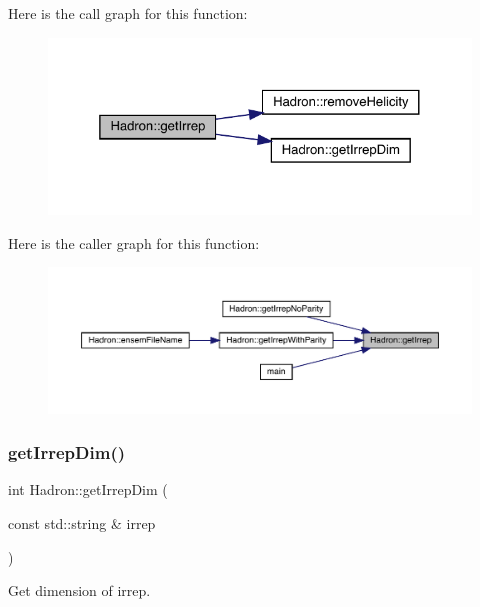 Here is the call graph for this function\+:\nopagebreak
\begin{figure}[H]
\begin{center}
\leavevmode
\includegraphics[width=325pt]{d1/daf/namespaceHadron_a33d1d1e15a13f881d974049a8ae1c3dc_cgraph}
\end{center}
\end{figure}
Here is the caller graph for this function\+:
\nopagebreak
\begin{figure}[H]
\begin{center}
\leavevmode
\includegraphics[width=350pt]{d1/daf/namespaceHadron_a33d1d1e15a13f881d974049a8ae1c3dc_icgraph}
\end{center}
\end{figure}
\mbox{\label{namespaceHadron_a0451202d2f27c90c438c0d23da609c62}} 
\subsubsection{\texorpdfstring{getIrrepDim()}{getIrrepDim()}}
{\footnotesize\ttfamily int Hadron\+::get\+Irrep\+Dim (\begin{DoxyParamCaption}\item[{const std\+::string \&}]{irrep }\end{DoxyParamCaption})}



Get dimension of irrep. 


